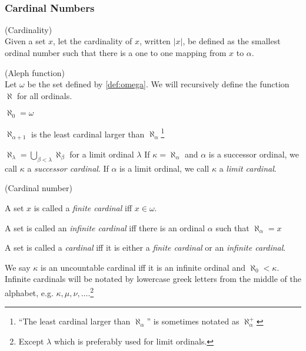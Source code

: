 \

\subsubsection{Cardinal Numbers}

\begin{definition}{(Cardinality)}\\
Given a set $x$, let the cardinality of $x$, written $|x|$, be defined as the smallest ordinal number such that there is a one to one mapping from $x$ to $\alpha$.
\end{definition}

\begin{definition}{(Aleph function)}\label{def:aleph}\\
Let $\omega$ be the set defined by \ref{def:omega}.
We will recursively define the function $\aleph$ for all ordinals.
\bce[(i)]
\item $\aleph_0 = \omega$
\item $\aleph_{\alpha+1}$ is the least cardinal larger than $\aleph_\alpha$\footnote{``The least cardinal larger than $\aleph_\alpha$'' is sometimes notated as $\aleph_\alpha^{+}$}
\item $\aleph_\lambda = \bigcup_{\beta < \lambda}\aleph_\beta$ for a limit ordinal $\lambda$
\ece
If $\kappa = \aleph_\alpha$ and $\alpha$ is a successor ordinal, we call $\kappa$ a \emph{successor cardinal}. If $\alpha$ is a limit ordinal, we call $\kappa$ a \emph{limit cardinal}.
\end{definition} %

\begin{definition}{(Cardinal number)}\label{def:cardinal}\\
\bce[(i)]
\item A set $x$ is called a \emph{finite cardinal} iff $x \in \omega$.
\item A set is called an \emph{infinite cardinal} iff there is an ordinal $\alpha$ such that $\aleph_\alpha = x$
\item A set is called a \emph{cardinal} iff it is either a \emph{finite cardinal} or an \emph{infinite cardinal}.
\ece
\end{definition}
We say $\kappa$ is an uncountable cardinal iff it is an infinite ordinal and $\aleph_0 < \kappa$.
Infinite cardinals will be notated by lowercase greek letters from the middle of the alphabet, e.g. $\kappa, \mu, \nu, \ldots$.\footnote{Except $\lambda$ which is preferably used for limit ordinals.}


